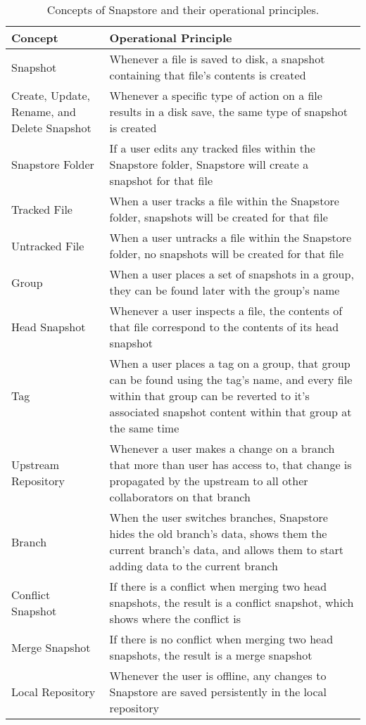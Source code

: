 \begin{table}
\begin{tabular}{ |p{5cm}||p{11cm}|}
 \hline
 \textbf{Concept} & \textbf{Operational Principle}\\[8pt]
 \hline
 Snapshot & Whenever a file is saved to disk, a snapshot containing that file's contents is created\\[8pt]
 Create, Update, Rename, and Delete Snapshot & Whenever a specific type of action on a file results in a disk save, the same type of snapshot is created\\[8pt]
 Snapstore Folder & If a user edits any tracked files within the Snapstore folder, Snapstore will create a snapshot for that file\\[8pt]
 Tracked File & When a user tracks a file within the Snapstore folder, snapshots will be created for that file\\[8pt]
 Untracked File & When a user untracks a file within the Snapstore folder, no snapshots will be created for that file\\[8pt]
 \hline
 Group & When a user places a set of snapshots in a group, they can be found later with the group's name\\[8pt]
 Head Snapshot & Whenever a user inspects a file, the contents of that file correspond to the contents of its head snapshot\\[8pt]
 Tag & When a user places a tag on a group, that group can be found using the tag's name, and every file within that group can be reverted to it's associated snapshot content within that group at the same time\\[8pt]
 \hline
 Upstream Repository & Whenever a user makes a change on a branch that more than user has access to, that change is propagated by the upstream to all other collaborators on that branch\\[8pt]
 \hline
 Branch & When the user switches branches, Snapstore hides the old branch's data, shows them the current branch's data, and allows them to start adding data to the current branch\\[8pt]
 Conflict Snapshot & If there is a conflict when merging two head snapshots, the result is a conflict snapshot, which shows where the conflict is\\[8pt]
 Merge Snapshot & If there is no conflict when merging two head snapshots, the result is a merge snapshot\\[8pt]
 \hline
 Local Repository & Whenever the user is offline, any changes to Snapstore are saved persistently in the local repository\\[8pt]
 \hline
\end{tabular}
\caption{Concepts of Snapstore and their operational principles.}
\end{table}

